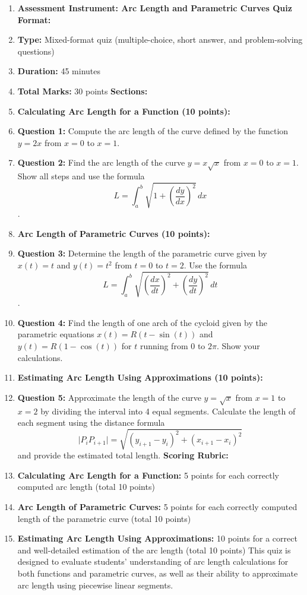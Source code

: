 \begin{enumerate}
    \item \textbf{Assessment Instrument: Arc Length and Parametric Curves Quiz} \textbf{Format:}
    \item \textbf{Type:} Mixed-format quiz (multiple-choice, short answer, and problem-solving questions)
    \item \textbf{Duration:} 45 minutes
    \item \textbf{Total Marks:} 30 points \textbf{Sections:}
    \item \textbf{Calculating Arc Length for a Function (10 points):}
    \item \textbf{Question 1:} Compute the arc length of the curve defined by the function $y = 2x$ from $x = 0$ to $x = 1$.
    \item \textbf{Question 2:} Find the arc length of the curve $y = x\sqrt{x}$ from $x = 0$ to $x = 1$. Show all steps and use the formula $$L = \int_a^b \sqrt{1 + \left(\frac{dy}{dx}\right)^2} \, dx$$.
    \item \textbf{Arc Length of Parametric Curves (10 points):}
    \item \textbf{Question 3:} Determine the length of the parametric curve given by $x(t) = t$ and $y(t) = t^2$ from $t = 0$ to $t = 2$. Use the formula $$L = \int_a^b \sqrt{\left(\frac{dx}{dt}\right)^2 + \left(\frac{dy}{dt}\right)^2} \, dt$$.
    \item \textbf{Question 4:} Find the length of one arch of the cycloid given by the parametric equations $x(t) = R(t - \sin(t))$ and $y(t) = R(1 - \cos(t))$ for $t$ running from $0$ to $2\pi$. Show your calculations.
    \item \textbf{Estimating Arc Length Using Approximations (10 points):}
    \item \textbf{Question 5:} Approximate the length of the curve $y = \sqrt{x}$ from $x = 1$ to $x = 2$ by dividing the interval into 4 equal segments. Calculate the length of each segment using the distance formula $$\bigl|P_iP_{i+1}\bigr| = \sqrt{(y_{i+1} - y_i)^2 + (x_{i+1} - x_i)^2}$$ and provide the estimated total length. \textbf{Scoring Rubric:}
    \item \textbf{Calculating Arc Length for a Function:} 5 points for each correctly computed arc length (total 10 points)
    \item \textbf{Arc Length of Parametric Curves:} 5 points for each correctly computed length of the parametric curve (total 10 points)
    \item \textbf{Estimating Arc Length Using Approximations:} 10 points for a correct and well-detailed estimation of the arc length (total 10 points) This quiz is designed to evaluate students' understanding of arc length calculations for both functions and parametric curves, as well as their ability to approximate arc length using piecewise linear segments.
\end{enumerate}

